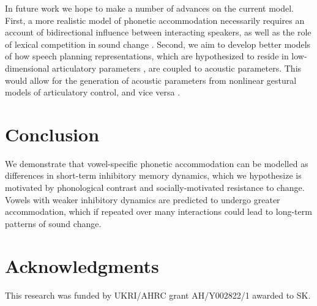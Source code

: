\documentclass[10pt,letterpaper]{article}
\begin{document}
In future work we hope to make a number of advances on the current model. First, a more realistic model of phonetic accommodation necessarily requires an account of bidirectional influence between interacting speakers, as well as the role of lexical competition in sound change \citep{wedel2012}. Second, we aim to develop better models of how speech planning representations, which are hypothesized to reside in low-dimensional articulatory parameters \citep{browman-goldstein1992}, are coupled to acoustic parameters. This would allow for the generation of acoustic parameters from nonlinear gestural models of articulatory control, and vice versa \citep{kirkham2025, sorensen-gafos2016, stern-shaw2024}.

\section{Conclusion}

We demonstrate that vowel-specific phonetic accommodation can be modelled as differences in short-term inhibitory memory dynamics, which we hypothesize is motivated by phonological contrast and socially-motivated resistance to change. Vowels with weaker inhibitory dynamics are predicted to undergo greater accommodation, which if repeated over many interactions could lead to long-term patterns of sound change.


\clearpage
\section{Acknowledgments}

This research was funded by UKRI/AHRC grant AH/Y002822/1 awarded to SK.





\setlength{\bibleftmargin}{.125in}
\setlength{\bibindent}{-\bibleftmargin}


\end{document}
